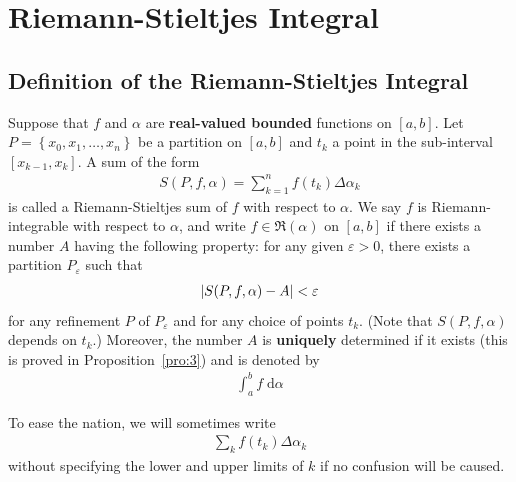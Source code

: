 \documentclass[thmcnt=section, 12pt]{my-elegantbook}
\begin{document}

\chapter{Riemann-Stieltjes Integral} \label{chap:1}

\section{Definition of the Riemann-Stieltjes Integral}


\begin{definition} \label{def:1}
    Suppose that $f$ and $\alpha$ are \textbf{real-valued bounded} functions on $[a,b]$. Let $P = \left\{x_0, x_1, \ldots, x_n\right\}$ be a partition on $[a, b]$ and $t_k$ a point in the sub-interval $[x_{k-1}, x_k]$. A sum of the form 
    \begin{align*}
        S(P,f,\alpha)
        = \sum_{k=1}^n f(t_k) \Delta \alpha_k
    \end{align*}
    is called a Riemann-Stieltjes sum of $f$ with respect to $\alpha$. We say $f$ is Riemann-integrable with respect to $\alpha$, and write $f \in \mathfrak{R}(\alpha)$ on $[a,b]$ if there exists a number $A$ having the following property: for any given $\varepsilon > 0$, there exists a partition $P_\varepsilon$ such that 
    \begin{align*}
        \left\lvert S(P,f,\alpha) - A \right\rvert < \varepsilon
    \end{align*}
    for any refinement $P$ of $P_\varepsilon$ and for any choice of points $t_k$. (Note that $S(P,f,\alpha)$ depends on $t_k$.) Moreover, the number $A$ is \textbf{uniquely} determined if it exists (this is proved in Proposition~\ref{pro:3}) and is denoted by \begin{align*}
        \int_a^b f \; \mathrm{d}\alpha
    \end{align*}
\end{definition}

\begin{note}
    To ease the nation, we will sometimes write
    \begin{align*}
        \sum_{k} f(t_k) \Delta \alpha_k
    \end{align*}
    without specifying the lower and upper limits of $k$ if no confusion will be caused.
\end{note}

\end{document}
